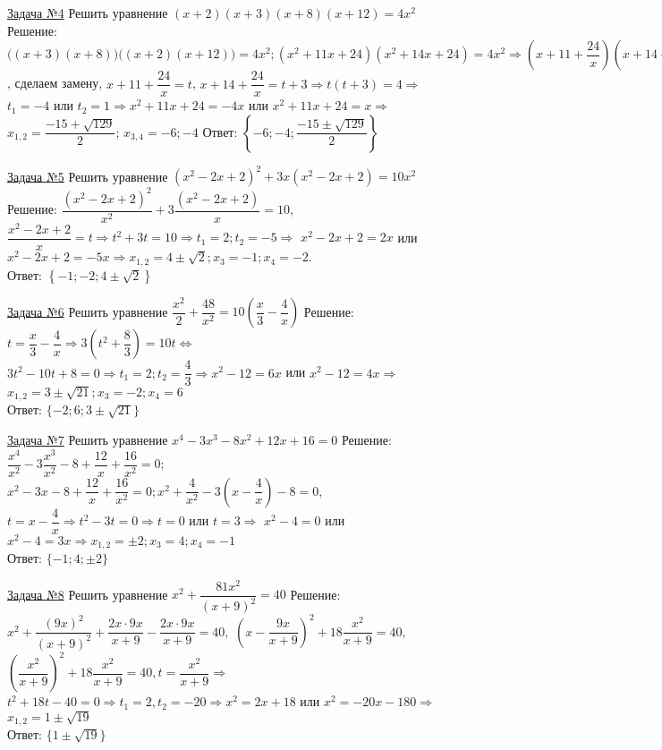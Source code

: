 \documentclass[a4paper,12pt]{article} %
\begin{document}
\label{Problem4}
\underline{Задача №4}
Решить уравнение $(x+2)(x+3)(x+8)(x+12)=4x^2$\newline
Решение: $\big((x+3)(x+8) \big) \big( (x+2)(x+12) \big)=4x^2 ; (x^2+11x+24)(x^2+14x+24)=4x^2 \Rightarrow 
\left( x+11+\dfrac{24}{x} \right) \left( x+14+\dfrac{24}{x} \right) = 4$, сделаем замену, 
$x+11+\dfrac{24}{x}=t$, $x+14+\dfrac{24}{x}=t+3 \Rightarrow t(t+3)=4 \Rightarrow$
$t_1=-4$ или $t_2=1 \Rightarrow x^2+11x+24=-4x$ или $x^2+11x+24=x \Rightarrow$
$x_{1,2}=\dfrac{-15+\sqrt{129}}{2}$; $x_{3,4}=-6; -4$\newline
Ответ: $\left\{ -6; -4; \dfrac{-15\pm\sqrt{129}}{2} \right\}$

\label{Problem5}
\underline{Задача №5}
Решить уравнение $(x^2-2x+2)^2+3x(x^2-2x+2)=10x^2$\newline
Решение: $\dfrac{(x^2-2x+2)^2}{x^2}+3\dfrac{(x^2-2x+2)}{x}=10$, 
$\dfrac{x^2-2x+2}{x}=t \Rightarrow t^2+3t=10 \Rightarrow t_1=2; t_2=-5 \Rightarrow$
$x^2-2x+2=2x$ или $x^2-2x+2=-5x \Rightarrow x_{1,2}=4\pm\sqrt2; x_3=-1; x_4=-2.$\\
Ответ: $\left\{ -1; -2; 4\pm\sqrt2 \right\}$

\label{Problem6}
\underline{Задача №6}
Решить уравнение $\dfrac{x^2}{2}+\dfrac{48}{x^2}=10\left(\dfrac{x}3-\dfrac{4}{x}\right)$\newline
Решение: $t=\dfrac{x}{3}-\dfrac{4}{x} \Rightarrow 3\left(t^2+\dfrac{8}{3}\right)=10t \Leftrightarrow$
$3t^2-10t+8=0 \Rightarrow t_1=2;t_2=\dfrac43 \Rightarrow x^2-12=6x$ или $x^2-12=4x \Rightarrow$
$x_{1,2}=3\pm\sqrt{21}; x_3=-2; x_4=6$\\
Ответ: $\{ -2; 6; 3\pm\sqrt{21} \}$
 
\label{Problem7}
\underline{Задача №7}
Решить уравнение $x^4-3x^3-8x^2+12x+16=0$\newline
Решение: $\dfrac{x^4}{x^2}-3\dfrac{x^3}{x^2}-8+\dfrac{12}{x}+\dfrac{16}{x^2}=0; $
$x^2-3x-8+\dfrac{12}{x}+\dfrac{16}{x^2}=0; x^2+\dfrac{4}{x^2}-3\left( x-\dfrac{4}{x} \right)-8=0,$
$t=x-\dfrac{4}{x} \Rightarrow t^2-3t=0 \Rightarrow t=0$ или $t=3 \Rightarrow$
$x^2-4=0$ или $x^2-4=3x \Rightarrow x_{1,2}=\pm2; x_3=4; x_4=-1$\\
Ответ: $\{ -1; 4; \pm2 \}$

\label{Problem8}
\underline{Задача №8} 
Решить уравнение $x^2+\dfrac{81x^2}{(x+9)^2}=40$\newline
Решение: $x^2+\dfrac{(9x)^2}{(x+9)^2}+\dfrac{2x\cdot9x}{x+9}-\dfrac{2x\cdot9x}{x+9}=40, $
$\left(x-\dfrac{9x}{x+9}\right)^2+18\dfrac{x^2}{x+9}=40,$
$\left( \dfrac{x^2}{x+9} \right)^2+18\dfrac{x^2}{x+9}=40, t=\dfrac{x^2}{x+9} \Rightarrow$
$t^2+18t-40=0 \Rightarrow t_1=2, t_2=-20 \Rightarrow x^2=2x+18$ или $x^2=-20x-180 \Rightarrow$
$x_{1,2}=1\pm\sqrt{19}$\\
Ответ: $\{ 1\pm\sqrt{19} \}$
\end{document}
